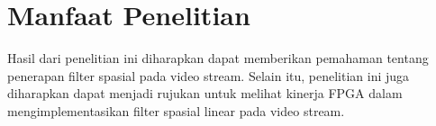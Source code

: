 \section{Manfaat Penelitian}
Hasil dari penelitian ini diharapkan dapat memberikan pemahaman tentang penerapan filter spasial pada video stream. Selain itu, penelitian ini juga diharapkan dapat menjadi rujukan untuk melihat kinerja FPGA dalam mengimplementasikan filter spasial linear pada video stream.





